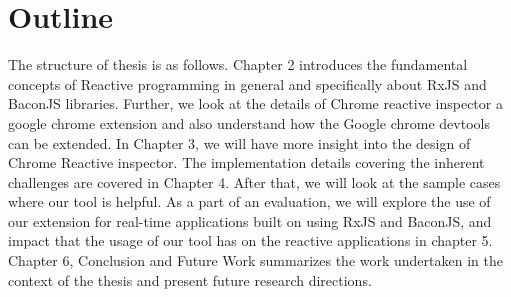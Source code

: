 \section{Outline}

The structure of thesis is as follows. Chapter 2 introduces the fundamental concepts of Reactive programming in general and specifically about RxJS and BaconJS libraries. 
Further, we look at the details of Chrome reactive inspector a google chrome extension and also understand how the Google chrome devtools can be extended. In Chapter 3, we will have more insight into the design of Chrome Reactive inspector. 
The implementation details covering the inherent challenges are covered in Chapter 4. 
After that, we will look at the sample cases where our tool is helpful. 
As a part of an evaluation, we will explore the use of our extension for real-time applications built on using RxJS and BaconJS, and impact that the usage of our tool has on the reactive applications in chapter 5. 
Chapter 6, Conclusion and Future Work summarizes the work undertaken in the context of the thesis and present future research directions.


